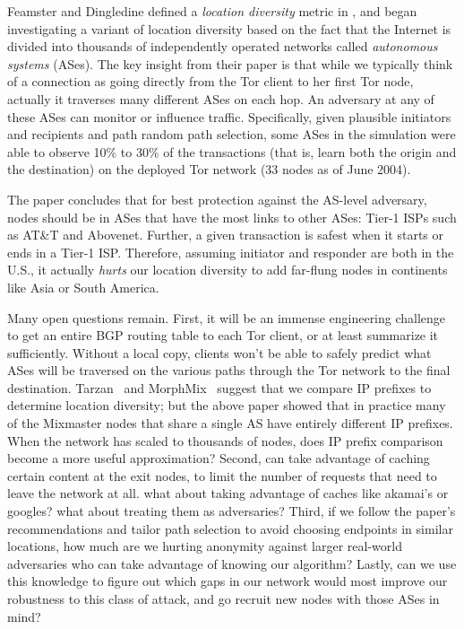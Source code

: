 \documentclass{llncs}
\begin{document}
Feamster and Dingledine defined a \emph{location diversity} metric
in \cite{feamster:wpes2004}, and began investigating a variant of location
diversity based on the fact that the Internet is divided into thousands of
independently operated networks called {\em autonomous systems} (ASes).
The key insight from their paper is that while we typically think of a
connection as going directly from the Tor client to her first Tor node,
actually it traverses many different ASes on each hop. An adversary at
any of these ASes can monitor or influence traffic. Specifically, given
plausible initiators and recipients and path random path selection,
some ASes in the simulation were able to observe 10\% to 30\% of the
transactions (that is, learn both the origin and the destination) on
the deployed Tor network (33 nodes as of June 2004).

The paper concludes that for best protection against the AS-level
adversary, nodes should be in ASes that have the most links to other ASes:
Tier-1 ISPs such as AT\&T and Abovenet. Further, a given transaction
is safest when it starts or ends in a Tier-1 ISP. Therefore, assuming
initiator and responder are both in the U.S., it actually \emph{hurts}
our location diversity to add far-flung nodes in continents like Asia
or South America.

Many open questions remain. First, it will be an immense engineering
challenge to get an entire BGP routing table to each Tor client, or at
least summarize it sufficiently. Without a local copy, clients won't be
able to safely predict what ASes will be traversed on the various paths
through the Tor network to the final destination. Tarzan~\cite{tarzan:ccs02}
and MorphMix~\cite{morphmix:fc04} suggest that we compare IP prefixes to
determine location diversity; but the above paper showed that in practice
many of the Mixmaster nodes that share a single AS have entirely different
IP prefixes. When the network has scaled to thousands of nodes, does IP
prefix comparison become a more useful approximation?
%
Second, can take advantage of caching certain content at the exit nodes, to
limit the number of requests that need to leave the network at all.
what about taking advantage of caches like akamai's or googles? what
about treating them as adversaries?
%
Third, if we follow the paper's recommendations and tailor path selection
to avoid choosing endpoints in similar locations, how much are we hurting
anonymity against larger real-world adversaries who can take advantage
of knowing our algorithm?
%
Lastly, can we use this knowledge to figure out which gaps in our network
would most improve our robustness to this class of attack, and go recruit
new nodes with those ASes in mind?
\end{document}
